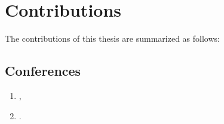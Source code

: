 

\section{Contributions}
The contributions of this thesis are summarized as follows:
\subsection*{Conferences}
\nobibliography*
\begin{enumerate}
    \item {},
    \item {}.
\end{enumerate}

